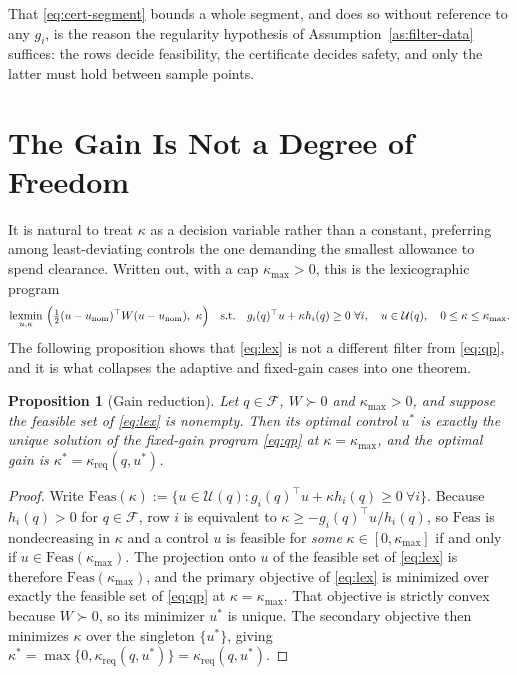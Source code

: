 \documentclass[11pt]{article}
\newtheorem{proposition}{Proposition}
\theoremstyle{remark}
\newcommand{\F}{\mathcal{F}}
\newcommand{\U}{\mathcal{U}}
\newcommand{\kreq}{\kappa_{\mathrm{req}}}
\newcommand{\unom}{u_{\mathrm{nom}}}
\newcommand{\kmax}{\kappa_{\max}}
\begin{document}
That \eqref{eq:cert-segment} bounds a whole segment, and does so without reference to any
$g_i$, is the reason the regularity hypothesis of Assumption~\ref{as:filter-data} suffices:
the rows decide feasibility, the certificate decides safety, and only the latter must hold
between sample points.

\section{The Gain Is Not a Degree of Freedom}
\label{sec:gain}

It is natural to treat $\kappa$ as a decision variable rather than a constant, preferring
among least-deviating controls the one demanding the smallest allowance to spend clearance.
Written out, with a cap $\kmax>0$, this is the lexicographic program
\begin{equation}
\operatorname*{lexmin}_{u,\kappa}\ \Bigl(\tfrac12(u-\unom)^\top W(u-\unom),\ \kappa\Bigr)
\quad\text{s.t.}\quad
g_i(q)^\top u+\kappa h_i(q)\ge 0\ \forall i,
\quad u\in\U(q),
\quad 0\le\kappa\le\kmax.
\label{eq:lex}
\end{equation}
The following proposition shows that \eqref{eq:lex} is not a different filter from
\eqref{eq:qp}, and it is what collapses the adaptive and fixed-gain cases into one theorem.

\begin{proposition}[Gain reduction]
\label{prop:reduction}
Let $q\in\F$, $W\succ0$ and $\kmax>0$, and suppose the feasible set of \eqref{eq:lex} is
nonempty. Then its optimal control $u^\ast$ is exactly the unique solution of the
fixed-gain program \eqref{eq:qp} at $\kappa=\kmax$, and the optimal gain is
$\kappa^\ast=\kreq(q,u^\ast)$.
\end{proposition}

\begin{proof}
Write $\mathrm{Feas}(\kappa):=\{u\in\U(q): g_i(q)^\top u+\kappa h_i(q)\ge0\ \forall i\}$.
Because $h_i(q)>0$ for $q\in\F$, row $i$ is equivalent to
$\kappa\ge-g_i(q)^\top u/h_i(q)$, so $\mathrm{Feas}$ is nondecreasing in $\kappa$ and a
control $u$ is feasible for \emph{some} $\kappa\in[0,\kmax]$ if and only if
$u\in\mathrm{Feas}(\kmax)$. The projection onto $u$ of the feasible set of \eqref{eq:lex}
is therefore $\mathrm{Feas}(\kmax)$, and the primary objective of \eqref{eq:lex} is
minimized over exactly the feasible set of \eqref{eq:qp} at $\kappa=\kmax$. That objective
is strictly convex because $W\succ0$, so its minimizer $u^\ast$ is unique. The secondary
objective then minimizes $\kappa$ over the singleton $\{u^\ast\}$, giving
$\kappa^\ast=\max\{0,\kreq(q,u^\ast)\}=\kreq(q,u^\ast)$.
\end{proof}
\end{document}
